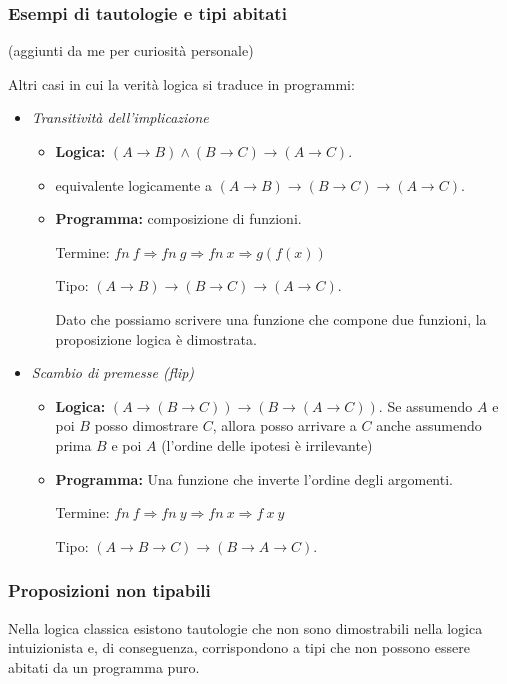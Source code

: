 \documentclass[a4paper,11pt]{report}
\begin{document}
\subsubsection{Esempi di tautologie e tipi abitati}
{\color{gray}(aggiunti da me per curiosità personale)}

Altri casi in cui la verità logica si traduce in programmi:

\begin{itemize}
    \item \textit{Transitività dell'implicazione}
    \begin{itemize}
        \item \textbf{Logica:} $(A \to B) \land (B \to C) \to (A \to C)$.
        \item equivalente logicamente a $(A \to B) \to (B \to C) \to (A \to C)$.
        \item \textbf{Programma:} composizione di funzioni. 

            \subitem Termine: $fn \ f \Rightarrow fn \ g \Rightarrow fn \ x \Rightarrow g(f(x))$ 

        \subitem Tipo: $(A \to B) \to (B \to C) \to (A \to C)$.
        
    \subitem Dato che possiamo scrivere una funzione che compone due funzioni, la proposizione logica è dimostrata.
    \end{itemize}

\item \textit{Scambio di premesse (flip)}
\begin{itemize}
    \item \textbf{Logica:} $(A \to (B \to C)) \to (B \to (A \to C))$.
    \subitem Se assumendo $A$ e poi $B$ posso dimostrare $C$, allora posso arrivare a $C$ anche assumendo prima $B$ e poi $A$ (l'ordine delle ipotesi è irrilevante)
    \item \textbf{Programma:} Una funzione che inverte l'ordine degli argomenti.

    Termine: $fn \ f \Rightarrow fn \ y \Rightarrow fn \ x \Rightarrow f \ x \ y$ 

    Tipo: $(A \to B \to C) \to (B \to A \to C)$.

\end{itemize}

\end{itemize}

\subsubsection{Proposizioni non tipabili}
Nella logica classica esistono tautologie che non sono dimostrabili nella logica intuizionista e, di conseguenza, corrispondono a tipi che non possono essere abitati da un programma puro.
\end{document}
